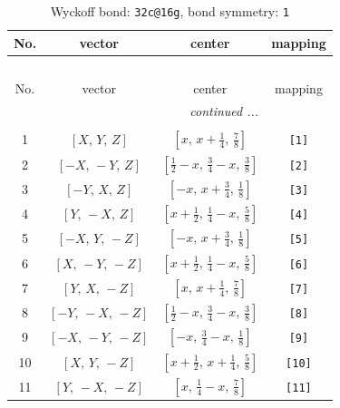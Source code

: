 \documentclass[fleqn,8pt]{jsarticle}
\begin{document}
\begin{longtable}{cccc}
\caption{Wyckoff bond: {\tt 32c@16g}, bond symmetry: {\tt 1}}
 \\
 \hline \hline
No. & vector & center & mapping \\ \hline \endfirsthead

\multicolumn{3}{l}{\tablename\ \thetable{}} \\
 \hline \hline
No. & vector & center & mapping \\ \hline \endhead

 \hline \hline
\multicolumn{3}{r}{\footnotesize\it continued ...} \\ \endfoot

 \hline \hline
\multicolumn{3}{r}{} \\ \endlastfoot

1 & $\left[ X,\, Y,\, Z \right]$ & $\left[ x,\, x + \frac{1}{4},\, \frac{7}{8} \right]$ & {\tt [1]} \\ \hline
2 & $\left[ - X,\, - Y,\, Z \right]$ & $\left[ \frac{1}{2} - x,\, \frac{3}{4} - x,\, \frac{3}{8} \right]$ & {\tt [2]} \\ \hline
3 & $\left[ - Y,\, X,\, Z \right]$ & $\left[ - x,\, x + \frac{3}{4},\, \frac{1}{8} \right]$ & {\tt [3]} \\ \hline
4 & $\left[ Y,\, - X,\, Z \right]$ & $\left[ x + \frac{1}{2},\, \frac{1}{4} - x,\, \frac{5}{8} \right]$ & {\tt [4]} \\ \hline
5 & $\left[ - X,\, Y,\, - Z \right]$ & $\left[ - x,\, x + \frac{3}{4},\, \frac{1}{8} \right]$ & {\tt [5]} \\ \hline
6 & $\left[ X,\, - Y,\, - Z \right]$ & $\left[ x + \frac{1}{2},\, \frac{1}{4} - x,\, \frac{5}{8} \right]$ & {\tt [6]} \\ \hline
7 & $\left[ Y,\, X,\, - Z \right]$ & $\left[ x,\, x + \frac{1}{4},\, \frac{7}{8} \right]$ & {\tt [7]} \\ \hline
8 & $\left[ - Y,\, - X,\, - Z \right]$ & $\left[ \frac{1}{2} - x,\, \frac{3}{4} - x,\, \frac{3}{8} \right]$ & {\tt [8]} \\ \hline
9 & $\left[ - X,\, - Y,\, - Z \right]$ & $\left[ - x,\, \frac{3}{4} - x,\, \frac{1}{8} \right]$ & {\tt [9]} \\ \hline
10 & $\left[ X,\, Y,\, - Z \right]$ & $\left[ x + \frac{1}{2},\, x + \frac{1}{4},\, \frac{5}{8} \right]$ & {\tt [10]} \\ \hline
11 & $\left[ Y,\, - X,\, - Z \right]$ & $\left[ x,\, \frac{1}{4} - x,\, \frac{7}{8} \right]$ & {\tt [11]} \\ \hline

\end{longtable}
\end{document}
